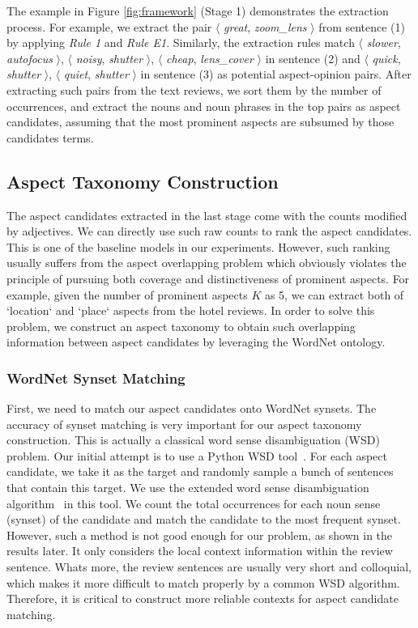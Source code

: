 \documentclass[11pt,a4paper]{article}
\newcommand{\figref}[1]{Figure \ref{#1}}
\begin{document}
The example in \figref{fig:framework} (Stage 1) demonstrates the extraction process. 
For example, we extract the pair $\langle$ \emph{great}, \emph{zoom\_lens }$\rangle$ from sentence (1) by applying
\emph{Rule 1} and \emph{Rule E1}.
Similarly, the extraction rules match
$\langle$ \emph{slower}, \emph{autofocus} $\rangle$,
$\langle$ \emph{noisy}, \emph{shutter} $\rangle$,
$\langle$ \emph{cheap}, \emph{lens\_cover} $\rangle$ in 
sentence (2) and 
$\langle$ \emph{quick}, \emph{shutter} $\rangle$, $\langle$ \emph{quiet}, \emph{shutter} $\rangle$ in sentence (3) as potential aspect-opinion pairs.
After extracting such pairs from the text reviews, 
we sort them by the number of occurrences,
and extract the nouns and noun phrases in the top pairs
as aspect candidates, assuming that
the most prominent aspects are subsumed by those candidates 
terms. 


\subsection{Aspect Taxonomy Construction}
\label{sec:taxonomy}
The aspect candidates extracted in the last stage come with the counts 
modified by adjectives. We can directly use such raw counts to rank 
the aspect candidates. This is one of the baseline models in 
our experiments.
However, such ranking usually suffers from the aspect overlapping problem
which obviously violates the principle of pursuing both coverage and 
distinctiveness of prominent aspects.
For example, given the number of prominent aspects 
$K$ as 5,
we can extract both of `location` and `place` aspects from
the hotel reviews. 
In order to solve this problem, we construct an aspect taxonomy 
to obtain such overlapping information between aspect candidates by
leveraging the WordNet ontology. 

\subsubsection{WordNet Synset Matching}
\label{sec:match}
First, we need to match our aspect candidates onto WordNet synsets.
The accuracy of synset matching is very important for our 
aspect taxonomy construction.
This is actually a classical word sense disambiguation (WSD) problem.
Our initial attempt is to use a Python WSD tool~\cite{pywsd14}.
For each aspect candidate, we take it as the target and 
randomly sample a bunch of sentences that contain this target. 
We use the extended word sense disambiguation algorithm~\cite{banerjee2003extended} 
in this tool. We count the total occurrences for each noun 
sense (synset) of the candidate and match the candidate to the most frequent
synset.  However, such a method is not good enough for our problem,
as shown in the results later.
It only considers the local context information within the review sentence. 
Whats more, the review sentences are usually very 
short and colloquial, which makes it 
more difficult to match properly by a common WSD algorithm.
Therefore, it is critical to construct more reliable contexts for 
aspect candidate matching. 
\end{document}
